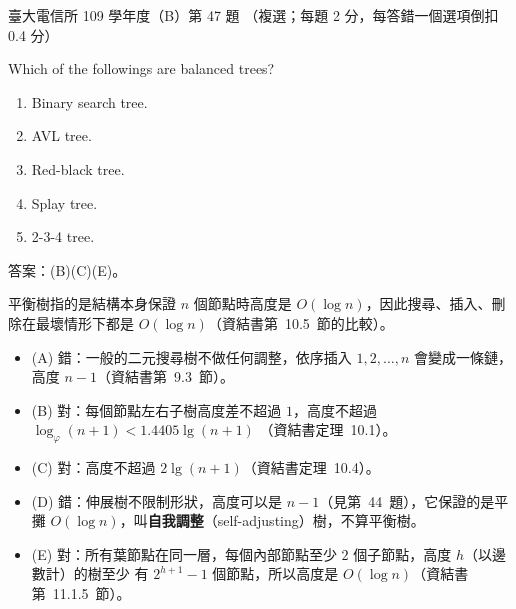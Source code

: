 \begin{pastexam}[label={px:ntu-109-comm-dsa-47}]{臺大電信所 109 學年度（B）第 47 題}
（複選；每題 2 分，每答錯一個選項倒扣 0.4 分）

Which of the followings are balanced trees?
\begin{enumerate}[label=(\Alph*),nosep]
\item Binary search tree.
\item AVL tree.
\item Red-black tree.
\item Splay tree.
\item 2-3-4 tree.
\end{enumerate}
\end{pastexam}

\begin{pastsoln}
答案：(B)(C)(E)。

平衡樹指的是結構本身保證 $n$ 個節點時高度是 $O(\log n)$，因此搜尋、插入、刪除在最壞情形下都是
$O(\log n)$（資結書第~10.5~節的比較）。
\begin{itemize}
\item (A) 錯：一般的二元搜尋樹不做任何調整，依序插入 $1, 2, \ldots, n$ 會變成一條鏈，高度
$n - 1$（資結書第~9.3~節）。
\item (B) 對：每個節點左右子樹高度差不超過 $1$，高度不超過 $\log_\varphi(n + 1) < 1.4405\lg(n + 1)$
（資結書定理~10.1）。
\item (C) 對：高度不超過 $2\lg(n + 1)$（資結書定理~10.4）。
\item (D) 錯：伸展樹不限制形狀，高度可以是 $n - 1$（見第~44~題），它保證的是平攤
$O(\log n)$，叫\textbf{自我調整}（self-adjusting）樹，不算平衡樹。
\item (E) 對：所有葉節點在同一層，每個內部節點至少 $2$ 個子節點，高度 $h$（以邊數計）的樹至少
有 $2^{h+1} - 1$ 個節點，所以高度是 $O(\log n)$（資結書第~11.1.5~節）。
\end{itemize}
\end{pastsoln}
